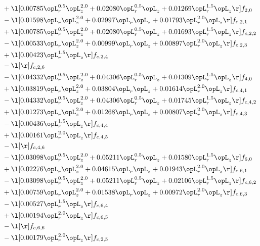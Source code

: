 \begin{alignat}{2}
& + \l[  0.00785 \opL_r^{0.5} \opL_z^{2.0} +  0.02080 \opL_r^{0.5} \opL_z +  0.01269 \opL_r^{1.5} \opL_z  \r] f_{2,0} \nonumber \\ 
& - \l[  0.01598 \opL_r \opL_z^{2.0} +  0.02997 \opL_r \opL_z +  0.01793 \opL_r^{2.0} \opL_z  \r] f_{c,2,1} \nonumber \\ 
& + \l[  0.00785 \opL_r^{0.5} \opL_z^{2.0} +  0.02080 \opL_r^{0.5} \opL_z +  0.01693 \opL_r^{1.5} \opL_z  \r] f_{c,2,2} \nonumber \\ 
& - \l[  0.00533 \opL_r \opL_z^{2.0} +  0.00999 \opL_r \opL_z +  0.00897 \opL_r^{2.0} \opL_z  \r] f_{c,2,3} \nonumber \\ 
& + \l[  0.00423 \opL_r^{1.5} \opL_z  \r] f_{c,2,4} \nonumber \\ 
& - \l[  \r] f_{c,2,6} \nonumber \\ 
& - \l[  0.04332 \opL_r^{0.5} \opL_z^{2.0} +  0.04306 \opL_r^{0.5} \opL_z +  0.01309 \opL_r^{1.5} \opL_z  \r] f_{4,0} \nonumber \\ 
& + \l[  0.03819 \opL_r \opL_z^{2.0} +  0.03804 \opL_r \opL_z +  0.01614 \opL_r^{2.0} \opL_z  \r] f_{c,4,1} \nonumber \\ 
& - \l[  0.04332 \opL_r^{0.5} \opL_z^{2.0} +  0.04306 \opL_r^{0.5} \opL_z +  0.01745 \opL_r^{1.5} \opL_z  \r] f_{c,4,2} \nonumber \\ 
& + \l[  0.01273 \opL_r \opL_z^{2.0} +  0.01268 \opL_r \opL_z +  0.00807 \opL_r^{2.0} \opL_z  \r] f_{c,4,3} \nonumber \\ 
& - \l[  0.00436 \opL_r^{1.5} \opL_z  \r] f_{c,4,4} \nonumber \\ 
& + \l[  0.00161 \opL_r^{2.0} \opL_z  \r] f_{c,4,5} \nonumber \\ 
& - \l[  \r] f_{c,4,6} \nonumber \\ 
& - \l[  0.03098 \opL_r^{0.5} \opL_z^{2.0} +  0.05211 \opL_r^{0.5} \opL_z +  0.01580 \opL_r^{1.5} \opL_z  \r] f_{6,0} \nonumber \\ 
& + \l[  0.02276 \opL_r \opL_z^{2.0} +  0.04615 \opL_r \opL_z +  0.01943 \opL_r^{2.0} \opL_z  \r] f_{c,6,1} \nonumber \\ 
& - \l[  0.03098 \opL_r^{0.5} \opL_z^{2.0} +  0.05211 \opL_r^{0.5} \opL_z +  0.02106 \opL_r^{1.5} \opL_z  \r] f_{c,6,2} \nonumber \\ 
& + \l[  0.00759 \opL_r \opL_z^{2.0} +  0.01538 \opL_r \opL_z +  0.00972 \opL_r^{2.0} \opL_z  \r] f_{c,6,3} \nonumber \\ 
& - \l[  0.00527 \opL_r^{1.5} \opL_z  \r] f_{c,6,4} \nonumber \\ 
& + \l[  0.00194 \opL_r^{2.0} \opL_z  \r] f_{c,6,5} \nonumber \\ 
& - \l[  \r] f_{c,6,6} \nonumber \\ 
& - \l[  0.00179 \opL_r^{2.0} \opL_z  \r] f_{c,2,5} \nonumber \\ 
\end{alignat} 


